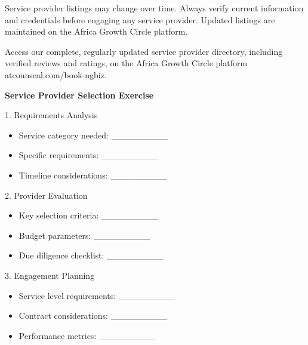 \begin{warningbox}
Service provider listings may change over time. Always verify current information and credentials before engaging any service provider. Updated listings are maintained on the Africa Growth Circle platform.
\end{warningbox}

\vspace{1em}

\begin{communitybox}
Access our complete, regularly updated service provider directory, including verified reviews and ratings, on the Africa Growth Circle platform atcounseal.com/book-ngbiz.
\end{communitybox}

\vspace{1em}

\begin{workshopbox}
\textbf{Service Provider Selection Exercise}

1. Requirements Analysis
\begin{itemize}[leftmargin=*]
    \item Service category needed: \_\_\_\_\_\_\_\_\_
    \item Specific requirements: \_\_\_\_\_\_\_\_\_
    \item Timeline considerations: \_\_\_\_\_\_\_\_\_
\end{itemize}

2. Provider Evaluation
\begin{itemize}[leftmargin=*]
    \item Key selection criteria: \_\_\_\_\_\_\_\_\_
    \item Budget parameters: \_\_\_\_\_\_\_\_\_
    \item Due diligence checklist: \_\_\_\_\_\_\_\_\_
\end{itemize}

3. Engagement Planning
\begin{itemize}[leftmargin=*]
    \item Service level requirements: \_\_\_\_\_\_\_\_\_
    \item Contract considerations: \_\_\_\_\_\_\_\_\_
    \item Performance metrics: \_\_\_\_\_\_\_\_\_
\end{itemize}
\end{workshopbox}